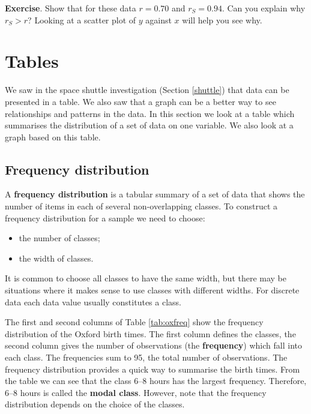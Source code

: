 \documentclass[
  british,
  11pt,
  openany, a4paper]{book}
\providecommand{\tightlist}{%
  \setlength{\itemsep}{0pt}\setlength{\parskip}{0pt}}
\begin{document}
\textbf{Exercise}. Show that for these data \(r=0.70\) and \(r_S=0.94\). Can you explain why \(r_S>r\)? Looking at a scatter plot of \(y\) against \(x\) will help you see why.

\section{Tables}\label{tables}

We saw in the space shuttle investigation (Section \ref{shuttle}) that data can be presented in a table. We also saw that a graph can be a better way to see relationships and patterns in the data. In this section we look at a table which summarises the distribution of a set of data on one variable. We also look at a graph based on this table.

\subsection{Frequency distribution}\label{frequency-distribution}

A \textbf{frequency distribution} is a tabular summary of a set of data that shows the number of items in each of several non-overlapping classes. To construct a frequency distribution for a sample we need to choose:

\begin{itemize}
\tightlist
\item
  the number of classes;
\item
  the width of classes.
\end{itemize}

It is common to choose all classes to have the same width, but there may be situations where it makes sense to use classes with different widths. For
discrete data each data value usually constitutes a class.

The first and second columns of Table \ref{tab:oxfreq} show the frequency distribution of the Oxford birth times. The first column defines the classes, the second column gives the number of observations (the \textbf{frequency}) which fall into each class. The frequencies sum to 95, the total number of observations. The frequency distribution provides a quick way to summarise the birth times. From the table we can see that the class 6--8 hours has the largest frequency. Therefore, 6--8 hours is called the \textbf{modal class}. However, note that the frequency distribution depends on the choice of the classes.
\end{document}

